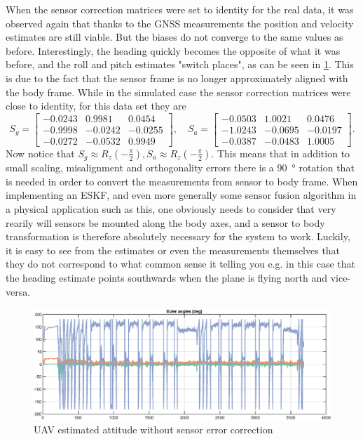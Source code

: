 When the sensor correction matrices were set to identity for the real data, it was observed again that thanks to the GNSS measurements the position and velocity estimates are still viable. But the biases do not converge to the same values as before. Interestingly, the heading quickly becomes the opposite of what it was before, and the roll and pitch estimates "switch places", as can be seen in \cref{fig:ga_2_real_bad}. This is due to the fact that the sensor frame is no longer approximately aligned with the body frame. While in the simulated case the sensor correction matrices were close to identity, for this data set they are
\begin{equation}
    S_g = \begin{bmatrix}
        -0.0243 & 0.9981  & 0.0454 \\
        -0.9998 & -0.0242 & -0.0255 \\
        -0.0272 & -0.0532 & 0.9949
    \end{bmatrix}, \quad
    S_a = \begin{bmatrix}
        -0.0503 & 1.0021  & 0.0476 \\
        -1.0243 & -0.0695 & -0.0197 \\
        -0.0387 & -0.0483 & 1.0005
    \end{bmatrix}.
\end{equation}
Now notice that $S_g \approx R_z(-\frac{\pi}{2}), S_a \approx R_z(-\frac{\pi}{2})$. This means that in addition to small scaling, misalignment and orthogonality errors there is a \SI{90}{\degree} rotation that is needed in order to convert the measurements from sensor to body frame. When implementing an ESKF, and even more generally some sensor fusion algorithm in a physical application such as this, one obviously needs to consider that very rearily will sensors be mounted along the body axes, and a sensor to body transformation is therefore absolutely necessary for the system to work. Luckily, it is easy to see from the estimates or even the measurements themselves that they do not correspond to what common sense it telling you e.g. in this case that the heading estimate points southwards when the plane is flying north and vice-versa. 

\begin{figure}[!htb]
    \centering
    \includegraphics[width=0.8\linewidth]{figures/ga_2/real_bad_heading.eps}
    \caption{UAV estimated attitude without sensor error correction}
    \label{fig:ga_2_real_bad}
\end{figure}

